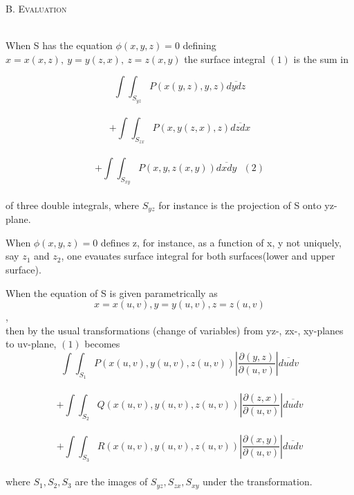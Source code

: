 \documentclass[12]{article}
\begin{document}
\begin{large} %
\textsc{B. Evaluation }
\end{large} \\

When S has the equation $ \phi (x,y,z) = 0 $ defining $ x = x(x,z),\ y = y(z,x),\  z = z(x,y) $ the surface integral $(1)$ is the sum in 


$$ \displaystyle \int 
			   	\int_{S_{yz}} 
					 P(x(y,z),y,z) \overline {dydz} $$\\
$$ \displaystyle + \int 
				   \int_{S_{zx}}
						 P(x,y(z,x),z) \overline {dzdx}$$\\
$$ \displaystyle + \int 
				   \int_{S_{xy}}
				   		P(x,y,z(x,y)) \overline {dxdy}\ \ \ (2) $$\\
of three double integrals, where $ S_{yz} $ for instance is the projection of S onto yz-plane. 

When $ \phi (x,y,z) = 0 $ defines z, for instance, as a function of x, y not uniquely, say $ z_1 $ and $ z_2 $, one evauates surface integral for both surfaces(lower and upper surface).  

When the equation of S is given parametrically as \\
$$ x = x(u,v), y = y(u,v), z = z(u,v) $$,\\
then by the usual transformations (change of variables) from yz-, zx-, xy-planes to uv-plane, $ (1) $ becomes\\
$$ \displaystyle \int
				 \int_{S_1}
				 	   P( x(u,v) , y(u,v) , z(u,v)) 
				 	   		\left|
				 	   			\frac
				 	   				{\partial(y,z)}
				 	   				 {\partial(u,v)}
				 	   		\right|
				 	   	    \overline {dudv} $$ \\
$$ \displaystyle + \int
	   			  \int_{S_2}
				  	   Q( x(u,v) , y(u,v) , z(u,v))
				  	   		\left|
				  	   			\frac
				  	   				{\partial(z,x)}
				  	   				 {\partial(u,v)}
				  	   		\right|
				  	   		\overline {dudv} $$\\
$$ \displaystyle + \int
				   \int_{S_3}
				   		R( x(u,v) , y(u,v) , z(u,v))
				   			\left|
				   				\frac
				   					{\partial(x,y)}
				   					{\partial(u,v)}
				   			\right|
				   			\overline {dudv} $$\\
where $ S_1 , S_2 , S_3 $ are the images of $ S_{yz} , S_{zx} , S_{xy} $ under the transformation.
\end{document}
